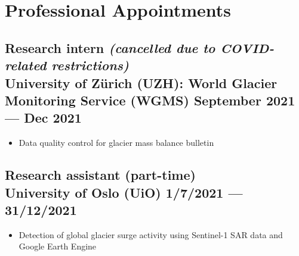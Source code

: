 \documentclass[a4,10pt]{article}
\newenvironment{zitemize}{
\begin{itemize}\itemsep2pt \parskip0pt \parsep1pt}
{\end{itemize}\vspace{-0.5cm}}
\begin{document}
\section{Professional Appointments} %


\subsection*{Research intern \textit{(cancelled due to COVID-related restrictions)} \\ University of Zürich (UZH): World Glacier Monitoring Service (WGMS)  \hfill September 2021 --- Dec 2021} 
    \begin{zitemize}
        \item Data quality control for glacier mass balance bulletin 
 
    \end{zitemize}

\subsection*{Research assistant (part-time) \\University of Oslo (UiO) \hfill 1/7/2021 --- 31/12/2021} 
    \begin{zitemize}
        \item Detection of global glacier surge activity using Sentinel-1 SAR data and Google Earth Engine 
    \end{zitemize}
\end{document}
